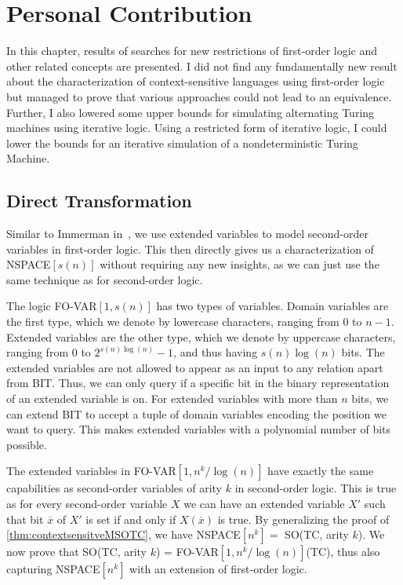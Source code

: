 \chapter{Personal Contribution}\label{ch:personal-contribution}

In this chapter, results of searches for new restrictions of first-order logic and other related concepts are presented.
I did not find any fundamentally new result about the characterization of context-sensitive languages using first-order logic but managed to prove that various approaches could not lead to an equivalence.
Further, I also lowered some upper bounds for simulating alternating Turing machines using iterative logic.
Using a restricted form of iterative logic, I could lower the bounds for an iterative simulation of a nondeterministic Turing Machine.


\section{Direct Transformation}\label{sec:direct-transformation}

Similar to Immerman in~\cite{descriptive-complexity}, we use extended variables to model second-order variables in first-order logic.
This then directly gives us a characterization of \acs{NSPACE}$[s(n)]$ without requiring any new insights, as we can just use the same technique as for second-order logic.

\begin{define}
    The logic \acs{FO-VAR}$[1, s(n)]$ has two types of variables.
    Domain variables are the first type, which we denote by lowercase characters, ranging from $0$ to $n - 1$.
    Extended variables are the other type, which we denote by uppercase characters, ranging from $0$ to $2^{s(n)\log(n)} - 1$, and thus having $s(n)\log(n)$ bits.
    The extended variables are not allowed to appear as an input to any relation apart from \acs{BIT}\@.
    Thus, we can only query if a specific bit in the binary representation of an extended variable is on.
    For extended variables with more than $n$ bits, we can extend \acs{BIT} to accept a tuple of domain variables encoding the position we want to query.
    This makes extended variables with a polynomial number of bits possible.
\end{define}

The extended variables in \acs{FO-VAR}$[1, n^k / \log(n)]$ have exactly the same capabilities as second-order variables of arity $k$ in second-order logic.
This is true as for every second-order variable $X$ we can have an extended variable $X'$ such that bit $\overline{x}$ of $X'$ is set if and only if $X(\overline{x})$ is true.
By generalizing the proof of \cref{thm:contextsensitveMSOTC}, we have \acs{NSPACE}$[n^k] = $ \acs{SO}(\acs{TC}, arity $k$).
We now prove that \acs{SO}(\acs{TC}, arity $k$) = \acs{FO-VAR}$[1, n^k/\log(n)]$(\acs{TC}), thus also capturing \acs{NSPACE}$[n^k]$ with an extension of first-order logic.

